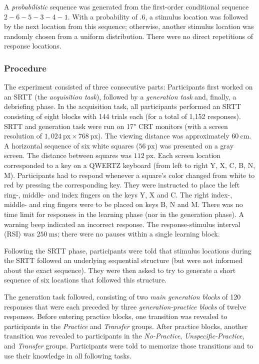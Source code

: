 \documentclass[man]{apa6}
\theoremstyle{definition}
\theoremstyle{definition}
\theoremstyle{definition}
\theoremstyle{remark}
\begin{document}
A \emph{probabilistic} sequence was generated from the first-order
conditional sequence \(2-6-5-3-4-1\). With a probability of \(.6\), a
stimulus location was followed by the next location from this sequence;
otherwise, another stimulus location was randomly chosen from a uniform
distribution. There were no direct repetitions of response locations.

\subsubsection{Procedure}\label{procedure}

The experiment consisted of three consecutive parts: Participants first
worked on an SRTT (the \emph{acquisition task}), followed by a
\emph{generation task} and, finally, a debriefing phase. In the
acquisition task, all participants performed an SRTT consisting of eight
blocks with 144 trials each (for a total of 1,152 responses). SRTT and
generation task were run on 17" CRT monitors (with a screen resolution
of \(1{,}024~\text{px} \times 768~\text{px}\)). The viewing distance was
approximately \(60~\text{cm}\). A horizontal sequence of six white
squares (\(56~\text{px}\)) was presented on a gray screen. The distance
between squares was \(112~\text{px}\). Each screen location corresponded
to a key on a QWERTZ keyboard (from left to right Y, X, C, B, N, M).
Participants had to respond whenever a square's color changed from white
to red by pressing the corresponding key. They were instructed to place
the left ring-, middle- and index fingers on the keys Y, X and C. The
right index-, middle- and ring fingers were to be placed on keys B, N
and M. There was no time limit for responses in the learning phase (nor
in the generation phase). A warning beep indicated an incorrect
response. The response-stimulus interval (RSI) was \(250~\text{ms}\);
there were no pauses within a single learning block.

Following the SRTT phase, participants were told that stimulus locations
during the SRTT followed an underlying sequential structure (but were
not informed about the exact sequence). They were then asked to try to
generate a short sequence of six locations that followed this structure.

The generation task followed, consisting of two \emph{main generation
blocks} of 120 responses that were each preceded by three
\emph{generation-practice blocks} of twelve responses. Before entering
practice blocks, one transition was revealed to participants in the
\emph{Practice} and \emph{Transfer} groups. After practice blocks,
another transition was revealed to participants in the
\emph{No-Practice}, \emph{Unspecific-Practice}, and \emph{Transfer}
groups. Participants were told to memorize those transitions and to use
their knowledge in all following tasks.
\end{document}
